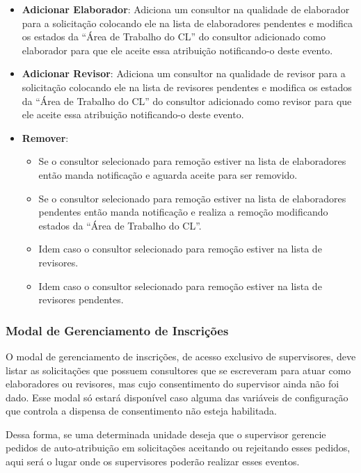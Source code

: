 \begin{itemize}
	\item \textbf{Adicionar Elaborador}: Adiciona um consultor na qualidade de elaborador para a solicitação colocando ele na lista de elaboradores pendentes e modifica os estados da ``Área de Trabalho do CL'' do consultor adicionado como elaborador para que ele aceite essa atribuição notificando-o deste evento. 
	
	\item \textbf{Adicionar Revisor}: Adiciona um consultor na qualidade de revisor para a solicitação colocando ele na lista de revisores pendentes e modifica os estados da ``Área de Trabalho do CL'' do consultor adicionado como revisor para que ele aceite essa atribuição notificando-o deste evento.
	
	\item \textbf{Remover}: 
	
	\begin{itemize}
		\item Se o consultor selecionado para remoção estiver na lista de elaboradores então manda notificação e aguarda aceite para ser removido. 
		\item Se o consultor selecionado para remoção estiver na lista de elaboradores pendentes então manda notificação e realiza a remoção modificando estados da ``Área de Trabalho do CL''. 
		\item Idem caso o consultor selecionado para remoção estiver na lista de revisores. 
		\item Idem caso o consultor selecionado para remoção estiver na lista de revisores pendentes. 
	\end{itemize}
\end{itemize}


\subsubsection{Modal de Gerenciamento de Inscrições}

O modal de gerenciamento de inscrições, de acesso exclusivo de supervisores, deve listar as solicitações que possuem consultores que se escreveram para atuar como elaboradores ou revisores, mas cujo consentimento do supervisor ainda não foi dado. Esse modal só estará disponível caso alguma das variáveis de configuração que controla a dispensa de consentimento não esteja habilitada.

Dessa forma, se uma determinada unidade deseja que o supervisor gerencie pedidos de auto-atribuição em solicitações aceitando ou rejeitando esses pedidos, aqui será o lugar onde os supervisores poderão realizar esses eventos.

